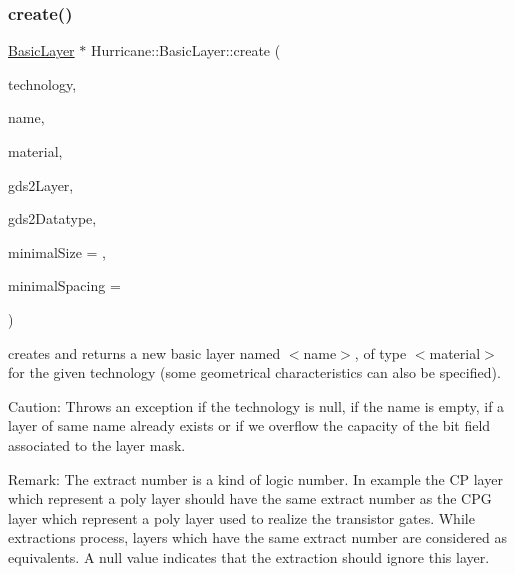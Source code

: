 \subsubsection{\texorpdfstring{create()}{create()}}
{\footnotesize\ttfamily \mbox{\hyperlink{classHurricane_1_1BasicLayer}{Basic\+Layer}} $\ast$ Hurricane\+::\+Basic\+Layer\+::create (\begin{DoxyParamCaption}\item[{\mbox{\hyperlink{classHurricane_1_1Technology}{Technology}} $\ast$}]{technology,  }\item[{const \mbox{\hyperlink{classHurricane_1_1Name}{Name}} \&}]{name,  }\item[{const \mbox{\hyperlink{classHurricane_1_1BasicLayer_1_1Material}{Material}} \&}]{material,  }\item[{unsigned}]{gds2\+Layer,  }\item[{unsigned}]{gds2\+Datatype,  }\item[{const \mbox{\hyperlink{group__DbUGroup_ga4fbfa3e8c89347af76c9628ea06c4146}{Db\+U\+::\+Unit}} \&}]{minimal\+Size = {},  }\item[{const \mbox{\hyperlink{group__DbUGroup_ga4fbfa3e8c89347af76c9628ea06c4146}{Db\+U\+::\+Unit}} \&}]{minimal\+Spacing = {} }\end{DoxyParamCaption})\hspace{0.3cm}{\ttfamily [static]}}

creates and returns a new basic layer named {\ttfamily $<$name$>$}, of type {\ttfamily $<$material$>$} for the given technology (some geometrical characteristics can also be specified).

\begin{DoxyParagraph}{Caution\+: Throws an exception if the technology is null, if the name is }
empty, if a layer of same name already exists or if we overflow the capacity of the bit field associated to the layer mask.
\end{DoxyParagraph}
\begin{DoxyParagraph}{Remark\+: The extract number is a kind of logic number. In example the }
CP layer which represent a poly layer should have the same extract number as the C\+PG layer which represent a poly layer used to realize the transistor gates. While extractions process, layers which have the same extract number are considered as equivalents. A null value indicates that the extraction should ignore this layer. 
\end{DoxyParagraph}
\mbox{\label{classHurricane_1_1BasicLayer_aeb7fd37db4ecf8e56e1992d6350fac58}} 
